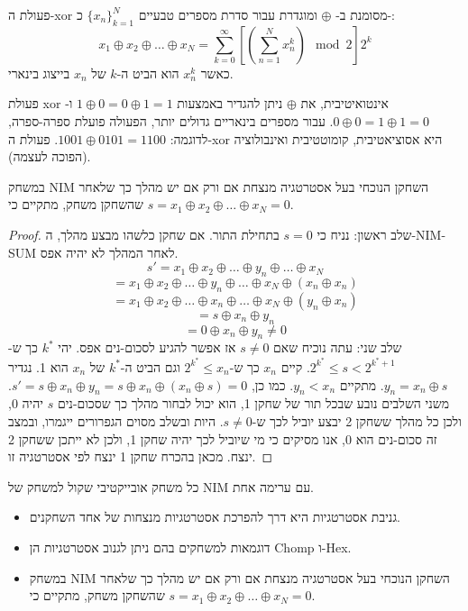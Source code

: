 \documentclass{tstextbook}
\begin{document}
\begin{definition}
פעולת ה-xor מסומנת ב- \(\oplus\) ומוגדרת עבור סדרת מספרים טבעיים \(\{x_n\}_{k=1}^N\) כ-:
$$x_1 \oplus x_2 \oplus \dots \oplus x_N = \sum_{k=0}^{\infty} \left[ \left( \sum_{n=1}^{N} x_n^k \right) \mod 2 \right] 2^k$$
כאשר \(x_n^k\) הוא הביט ה-\(k\) של \(x_n\) בייצוג בינארי.

\end{definition}
\begin{remark}
פעולת xor
אינטואיטיבית, את \(\oplus\) ניתן להגדיר באמצעות \(1 \oplus 0 = 0 \oplus 1 = 1\) ו- \(0 \oplus 0 = 1 \oplus 1 = 0\). עבור מספרים בינאריים גדולים יותר, הפעולה פועלת ספרה-ספרה, לדוגמה: \(1001 \oplus 0101 = 1100\). פעולת ה-xor היא אסוציאטיבית, קומוטטיבית ואינבולוציה (הפוכה לעצמה).

\end{remark}
\begin{proposition}
במשחק NIM השחקן הנוכחי בעל אסטרטגיה מנצחת אם ורק אם יש מהלך כך שלאחר שהשחקן משחק, מתקיים כי \(s = x_1 \oplus x_2 \oplus \dots \oplus x_N = 0\).

\end{proposition}
\begin{proof}
שלב ראשון: נניח כי \(s=0\) בתחילת התור. אם שחקן כלשהו מבצע מהלך, ה-NIM-SUM לאחר המהלך לא יהיה אפס.
$$s' = x_1 \oplus x_2 \oplus \dots \oplus y_n \oplus \dots \oplus x_N$$$$= x_1 \oplus x_2 \oplus \dots \oplus y_n \oplus \dots \oplus x_N \oplus (x_n \oplus x_n)$$$$= x_1 \oplus x_2 \oplus \dots \oplus x_n \oplus \dots \oplus x_N \oplus (y_n \oplus x_n)$$$$= s \oplus x_n \oplus y_n$$$$= 0 \oplus x_n \oplus y_n \neq 0$$
שלב שני: עתה נוכיח שאם \(s \neq 0\) אז אפשר להגיע לסכום-נים אפס. יהי \(k^*\) כך ש-\(2^{k^*} \le s < 2^{k^*+1}\). קיים \(x_n\) כך ש-\(2^{k^*} \le x_n\) וגם הביט ה-\(k^*\) של \(x_n\) הוא 1. נגדיר \(y_n = x_n \oplus s\). מתקיים \(y_n < x_n\). כמו כן, \(s' = s \oplus x_n \oplus y_n = s \oplus x_n \oplus (x_n \oplus s) = 0\).
משני השלבים נובע שבכל תור של שחקן 1, הוא יכול לבחור מהלך כך שסכום-נים \(s\) יהיה 0, ולכן כל מהלך ששחקן 2 יבצע יוביל לכך ש-\(s \neq 0\). היות ובשלב מסוים הגפרורים ייגמרו, ובמצב זה סכום-נים הוא 0, אנו מסיקים כי מי שיוביל לכך יהיה שחקן 1, ולכן לא ייתכן ששחקן 2 ינצח. מכאן בהכרח שחקן 1 ינצח לפי אסטרטגיה זו.

\end{proof}
\begin{theorem}
כל משחק אובייקטיבי שקול למשחק של NIM עם ערימה אחת.

\end{theorem}
\begin{summary}
  \begin{itemize}
    \item גניבת אסטרטגיות היא דרך להפרכת אסטרטגיות מנצחות של אחד השחקנים.
    \item דוגמאות למשחקים בהם ניתן לגנוב אסטרטגיות הן Chomp ו-Hex.
    \item במשחק NIM השחקן הנוכחי בעל אסטרטגיה מנצחת אם ורק אם יש מהלך כך שלאחר שהשחקן משחק, מתקיים כי \(s = x_1 \oplus x_2 \oplus \dots \oplus x_N = 0\).
  \end{itemize}
\end{summary}
\end{document}
